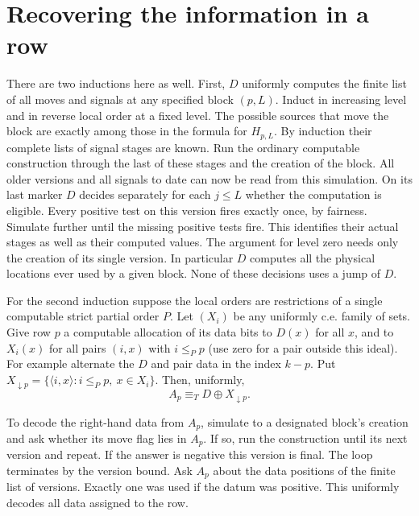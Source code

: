 \documentclass[11pt]{article}
\begin{document}
\section{Recovering the information in a row}
There are two inductions here as well. First, $D$ uniformly computes the finite list of all moves and signals at any specified block $(p,L)$. Induct in increasing level and in reverse local order at a fixed level. The possible sources that move the block are exactly among those in the formula for $H_{p,L}$. By induction their complete lists of signal stages are known. Run the ordinary computable construction through the last of these stages and the creation of the block. All older versions and all signals to date can now be read from this simulation. On its last marker $D$ decides separately for each $j\le L$ whether the computation is eligible. Every positive test on this version fires exactly once, by fairness. Simulate further until the missing positive tests fire. This identifies their actual stages as well as their computed values. The argument for level zero needs only the creation of its single version. In particular $D$ computes all the physical locations ever used by a given block. None of these decisions uses a jump of $D$.

For the second induction suppose the local orders are restrictions of a single computable strict partial order $P$. Let $(X_i)$ be any uniformly c.e. family of sets. Give row $p$ a computable allocation of its data bits to $D(x)$ for all $x$, and to $X_i(x)$ for all pairs $(i,x)$ with $i\le_P p$ (use zero for a pair outside this ideal). For example alternate the $D$ and pair data in the index $k-p$. Put $X_{\downarrow p}=\{\langle i,x\rangle:i\le_P p,\ x\in X_i\}$. Then, uniformly,
\[
                     A_p\equiv_T D\oplus X_{\downarrow p}.       \tag{2}
\]

To decode the right-hand data from $A_p$, simulate to a designated block's creation and ask whether its move flag lies in $A_p$. If so, run the construction until its next version and repeat. If the answer is negative this version is final. The loop terminates by the version bound. Ask $A_p$ about the data positions of the finite list of versions. Exactly one was used if the datum was positive. This uniformly decodes all data assigned to the row.
\end{document}
